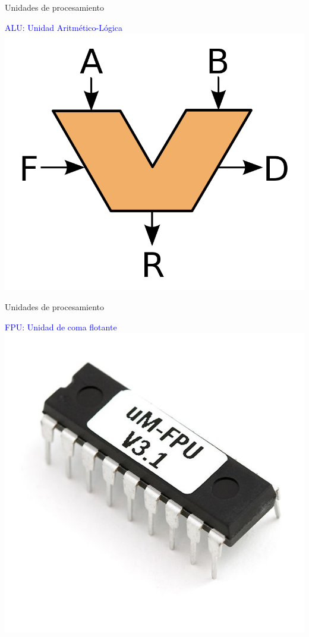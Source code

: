 \documentclass[10pt,xcolor={dvipsnames}]{beamer}
\begin{document}
\begin{frame}{Unidades de procesamiento}
\begin{center}
\Large{\textcolor{blue}{ALU: Unidad Aritmético-Lógica }} \pause
\includegraphics[scale=0.3]{Figures/4ALU}
\end{center}
\end{frame}

\begin{frame}{Unidades de procesamiento}
\begin{center}
\Large{\textcolor{blue}{FPU: Unidad de coma flotante}} \pause
\includegraphics[scale=0.4]{Figures/4fpu}
\end{center}
\end{frame}
\end{document}
